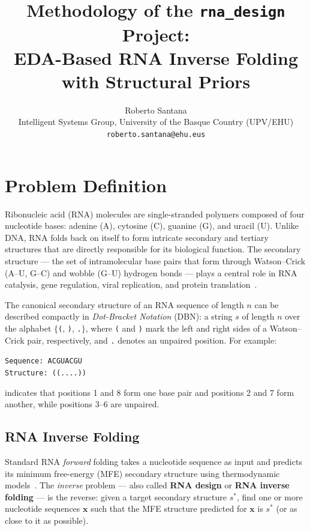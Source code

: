 \documentclass[11pt,a4paper]{article}
\title{\textbf{Methodology of the \texttt{rna\_design} Project:\\
  EDA-Based RNA Inverse Folding with Structural Priors}}
\author{Roberto Santana\\
  Intelligent Systems Group, University of the Basque Country (UPV/EHU)\\
  \texttt{roberto.santana@ehu.eus}}
\date{}
\begin{document}
\maketitle
\tableofcontents
\bigskip

\section{Problem Definition}
\label{sec:problem}

Ribonucleic acid (RNA) molecules are single-stranded polymers composed of
four nucleotide bases: adenine (A), cytosine (C), guanine (G), and uracil
(U). Unlike DNA, RNA folds back on itself to form intricate secondary and
tertiary structures that are directly responsible for its biological
function. The secondary structure — the set of intramolecular base pairs
that form through Watson--Crick (A–U, G–C) and wobble (G–U) hydrogen bonds
— plays a central role in RNA catalysis, gene regulation, viral replication,
and protein translation~\cite{tinoco1999rna}.

The canonical secondary structure of an RNA sequence of length $n$ can be
described compactly in \emph{Dot-Bracket Notation} (DBN): a string $s$ of
length $n$ over the alphabet $\{$\texttt{(}, \texttt{)}, \texttt{.}$\}$, where
\texttt{(} and \texttt{)} mark the left and right sides of a Watson--Crick pair,
respectively, and \texttt{.} denotes an unpaired position. For example:
\begin{center}
  \texttt{Sequence:    A\;C\;G\;U\;A\;C\;G\;U}\\
  \texttt{Structure:   (\;(\;.\;.\;.\;.\;)\;)}
\end{center}
indicates that positions 1 and 8 form one base pair and positions 2 and 7
form another, while positions 3–6 are unpaired.

\subsection{RNA Inverse Folding}

Standard RNA \emph{forward} folding takes a nucleotide sequence as input and
predicts its minimum free-energy (MFE) secondary structure using
thermodynamic models~\cite{zuker1989mfold, hofacker1994fast}. The
\emph{inverse} problem — also called \textbf{RNA design} or
\textbf{RNA inverse folding} — is the reverse: given a target secondary
structure $s^*$, find one or more nucleotide sequences $\mathbf{x}$ such
that the MFE structure predicted for $\mathbf{x}$ is $s^*$ (or as close to
it as possible).
\end{document}
